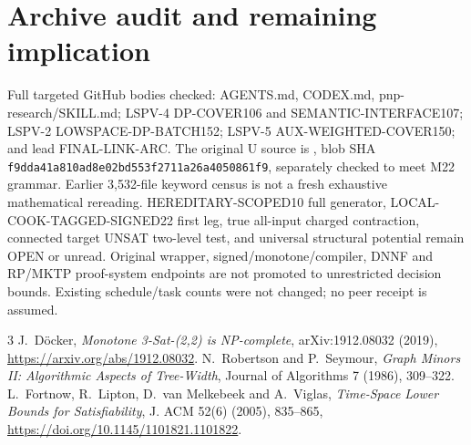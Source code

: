 \documentclass[11pt]{article}
\begin{document}
\section{Archive audit and remaining implication}
Full targeted GitHub bodies checked: AGENTS.md, CODEX.md, pnp-research/SKILL.md; LSPV-4 DP-COVER106 and SEMANTIC-INTERFACE107; LSPV-2 LOWSPACE-DP-BATCH152; LSPV-5 AUX-WEIGHTED-COVER150; and lead FINAL-LINK-ARC. The original U source is , blob SHA \texttt{f9dda41a810ad8e02bd553f2711a26a4050861f9}, separately checked to meet M22 grammar. Earlier 3,532-file keyword census is not a fresh exhaustive mathematical rereading. HEREDITARY-SCOPED10 full generator, LOCAL-COOK-TAGGED-SIGNED22 first leg, true all-input charged contraction, connected target UNSAT two-level test, and universal structural potential remain OPEN or unread. Original wrapper, signed/monotone/compiler, DNNF and RP/MKTP proof-system endpoints are not promoted to unrestricted decision bounds. Existing schedule/task counts were not changed; no peer receipt is assumed.
\begin{thebibliography}{3}
 J.~D\"ocker, \emph{Monotone 3-Sat-(2,2) is NP-complete}, arXiv:1912.08032 (2019), \url{https://arxiv.org/abs/1912.08032}.
 N.~Robertson and P.~Seymour, \emph{Graph Minors II: Algorithmic Aspects of Tree-Width}, Journal of Algorithms 7 (1986), 309--322.
 L.~Fortnow, R.~Lipton, D.~van Melkebeek and A.~Viglas, \emph{Time-Space Lower Bounds for Satisfiability}, J. ACM 52(6) (2005), 835--865, \url{https://doi.org/10.1145/1101821.1101822}.
\end{thebibliography}
\end{document}

